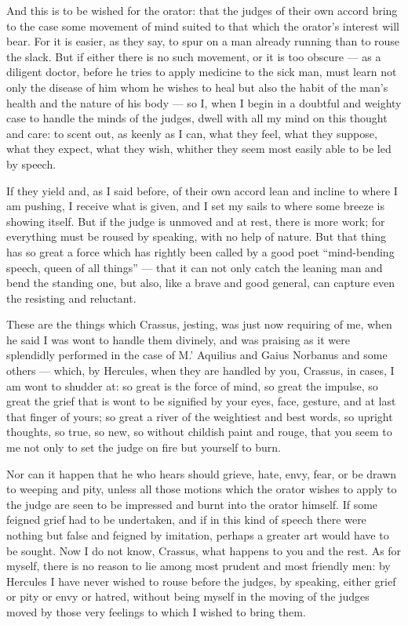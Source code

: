  And this is to be wished for the orator: that the judges of their own accord bring to the case some movement of mind suited to that which the orator's interest will bear. For it is easier, as they say, to spur on a man already running than to rouse the slack. But if either there is no such movement, or it is too obscure — as a diligent doctor, before he tries to apply medicine to the sick man, must learn not only the disease of him whom he wishes to heal but also the habit of the man's health and the nature of his body — so I, when I begin in a doubtful and weighty case to handle the minds of the judges, dwell with all my mind on this thought and care: to scent out, as keenly as I can, what they feel, what they suppose, what they expect, what they wish, whither they seem most easily able to be led by speech.

 If they yield and, as I said before, of their own accord lean and incline to where I am pushing, I receive what is given, and I set my sails to where some breeze is showing itself. But if the judge is unmoved and at rest, there is more work; for everything must be roused by speaking, with no help of nature. But that thing has so great a force which has rightly been called by a good poet ``mind-bending speech, queen of all things'' — that it can not only catch the leaning man and bend the standing one, but also, like a brave and good general, can capture even the resisting and reluctant.

 These are the things which Crassus, jesting, was just now requiring of me, when he said I was wont to handle them divinely, and was praising as it were splendidly performed in the case of M.' Aquilius and Gaius Norbanus and some others — which, by Hercules, when they are handled by you, Crassus, in cases, I am wont to shudder at: so great is the force of mind, so great the impulse, so great the grief that is wont to be signified by your eyes, face, gesture, and at last that finger of yours; so great a river of the weightiest and best words, so upright thoughts, so true, so new, so without childish paint and rouge, that you seem to me not only to set the judge on fire but yourself to burn.

 Nor can it happen that he who hears should grieve, hate, envy, fear, or be drawn to weeping and pity, unless all those motions which the orator wishes to apply to the judge are seen to be impressed and burnt into the orator himself. If some feigned grief had to be undertaken, and if in this kind of speech there were nothing but false and feigned by imitation, perhaps a greater art would have to be sought. Now I do not know, Crassus, what happens to you and the rest. As for myself, there is no reason to lie among most prudent and most friendly men: by Hercules I have never wished to rouse before the judges, by speaking, either grief or pity or envy or hatred, without being myself in the moving of the judges moved by those very feelings to which I wished to bring them.

